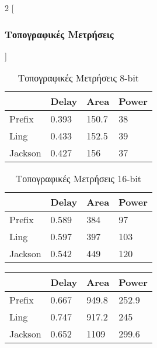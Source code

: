 \begin{multicols}{2}
[\subsubsection{Τοπογραφικές Μετρήσεις}]

\begin{table}[H]
\centering
     \begin{tabular}{||p{1.2cm} | p{0.7cm} p{1cm} p{1cm} ||} 
        \hline
         & Delay & Area & Power \\ [0.5ex]
        \hline\hline
        Prefix  & 0.393  & 150.7    & 38 \\ 
        \hline
        Ling    & 0.433  & 152.5    & 39 \\
        \hline
        Jackson & 0.427  & 156      & 37 \\
        \hline
    \end{tabular}
\caption{Τοπογραφικές Μετρήσεις 8-bit}
\label{topo_result_table_8}
\end{table}
\begin{table}[H]
\centering
     \begin{tabular}{||p{1.2cm} | p{0.7cm} p{1cm} p{1cm} ||} 
        \hline
         & Delay & Area & Power \\ [0.5ex] 
        \hline\hline
        Prefix  & 0.589  & 384    & 97 \\ 
        \hline
        Ling    & 0.597  & 397    & 103 \\
        \hline
        Jackson & 0.542  & 449    & 120 \\
        \hline
    \end{tabular}
\caption{Τοπογραφικές Μετρήσεις 16-bit}
\label{topo_result_table_16}
\end{table}
\begin{table}[H]
\centering
     \begin{tabular}{||p{1.2cm} | p{0.7cm} p{1cm} p{1cm} ||} 
        \hline
         & Delay & Area & Power \\ [0.5ex]
        \hline\hline
        Prefix  & 0.667  & 949.8    & 252.9 \\ 
        \hline
        Ling    & 0.747  & 917.2    & 245 \\
        \hline
        Jackson & 0.652  & 1109    & 299.6 \\
        \hline
    \end{tabular}

\end{table}
\end{multicols}
